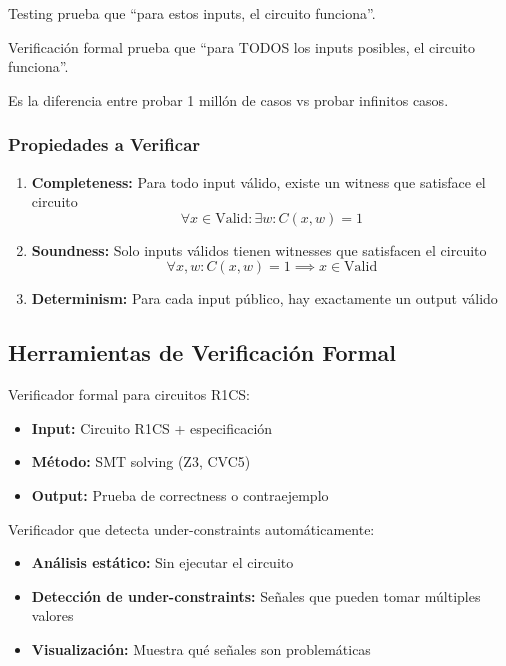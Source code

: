 \documentclass[11pt,a4paper,twoside]{book}
\begin{document}
\begin{intuicion}
Testing prueba que ``para estos inputs, el circuito funciona''.

Verificaci\'on formal prueba que ``para TODOS los inputs posibles, el circuito funciona''.

Es la diferencia entre probar 1 mill\'on de casos vs probar infinitos casos.
\end{intuicion}

\subsubsection{Propiedades a Verificar}

\begin{definition}
\begin{enumerate}
    \item \textbf{Completeness:} Para todo input v\'alido, existe un witness que satisface el circuito
    \[
    \forall x \in \text{Valid}: \exists w: C(x, w) = 1
    \]
    
    \item \textbf{Soundness:} Solo inputs v\'alidos tienen witnesses que satisfacen el circuito
    \[
    \forall x, w: C(x, w) = 1 \implies x \in \text{Valid}
    \]
    
    \item \textbf{Determinism:} Para cada input p\'ublico, hay exactamente un output v\'alido
\end{enumerate}
\end{definition}

\subsection{Herramientas de Verificaci\'on Formal}

\begin{definition}[Ecne]
Verificador formal para circuitos R1CS:
\begin{itemize}
    \item \textbf{Input:} Circuito R1CS + especificaci\'on
    \item \textbf{M\'etodo:} SMT solving (Z3, CVC5)
    \item \textbf{Output:} Prueba de correctness o contraejemplo
\end{itemize}
\end{definition}

\begin{definition}[Picus]
Verificador que detecta under-constraints autom\'aticamente:
\begin{itemize}
    \item \textbf{An\'alisis est\'atico:} Sin ejecutar el circuito
    \item \textbf{Detecci\'on de under-constraints:} Se\~nales que pueden tomar m\'ultiples valores
    \item \textbf{Visualizaci\'on:} Muestra qu\'e se\~nales son problem\'aticas
\end{itemize}
\end{definition}
\end{document}
